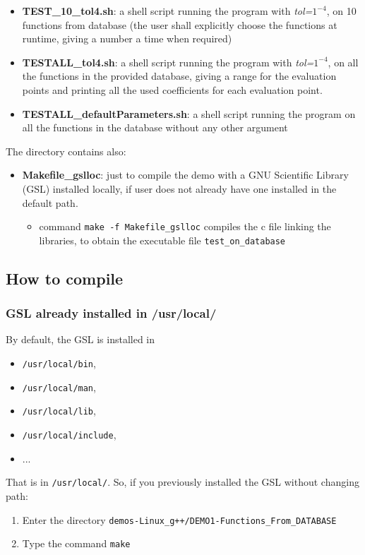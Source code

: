 \documentclass[10pt]{article}
\begin{document}
\begin{itemize}
\begin{itemize}
		      \item \textbf{TEST\_10\_tol\textendash 4.sh}:	a shell script running the program with \emph{tol=$1^{-4}$}, on 10 functions from database (the user shall explicitly choose the functions at runtime, giving a number a time when required)

		      \item \textbf{TESTALL\_tol\textendash 4.sh}:	a shell script running the program with \emph{tol=$1^{-4}$}, on all the functions in the provided database, giving a range for the evaluation points and printing all the used coefficients for each evaluation point.

		      \item \textbf{TESTALL\_defaultParameters.sh}:	a shell script running the program on all the functions in the database without any other argument
		      \end{itemize}
      \end{itemize}



The directory contains also:
    \begin{itemize}
    \item \textbf{Makefile\_gslloc}: just to compile the demo with a GNU Scientific Library (GSL) installed locally, if user does not already have one installed in the default path.
	  \begin{itemize}
	  \item command {\tt make -f Makefile\_gslloc} compiles the c file linking the libraries, to obtain the executable file {\tt test\_on\_database}
	  \end{itemize}
    \end{itemize}


\subsection{How to compile}

\subsubsection{GSL already installed in /usr/local/}

By default, the GSL is installed in
\begin{itemize}
 \item {\tt /usr/local/bin},
 \item {\tt /usr/local/man},
 \item {\tt /usr/local/lib},
 \item {\tt /usr/local/include},
 \item ...
\end{itemize}
That is in {\tt /usr/local/}. So, if you previously installed the GSL without changing path:
\begin{enumerate}
 \item Enter the directory {\tt demos-Linux\_g++/DEMO1-Functions\_From\_DATABASE}
 \item Type the command {\tt make}
\end{enumerate}
\end{document}
